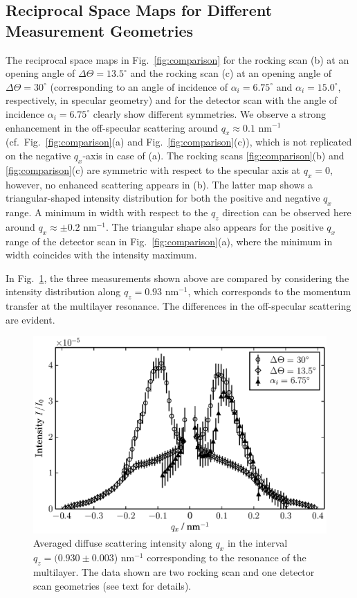 \subsection{Reciprocal Space Maps for Different Measurement Geometries} The reciprocal space maps in Fig.~\ref{fig:comparison} for the rocking scan (b) at an opening angle of $\Delta \Theta = 13.5^\circ$ and the rocking scan (c) at an opening angle of $\Delta \Theta = 30^\circ$ (corresponding to an angle of incidence of $\alpha_i = 6.75^\circ$ and $\alpha_i = 15.0^\circ$, respectively, in specular geometry) and for the detector scan with the angle of incidence $\alpha_i = 6.75^\circ$ clearly show different symmetries. We observe a strong enhancement in the off-specular scattering around $q_x\approx0.1$ nm$^{-1}$ (cf.~Fig.~\ref{fig:comparison}(a) and Fig.~\ref{fig:comparison}(c)), which is not replicated on the negative $q_x$-axis in case of (a). The rocking scans \ref{fig:comparison}(b) and \ref{fig:comparison}(c) are symmetric with respect to the specular axis at $q_x=0$, however, no enhanced scattering appears in (b). The latter map shows a triangular-shaped intensity distribution for both the positive and 
negative $q_x$ range. A minimum in width with respect to the $q_z$ direction can be observed here around $q_x \approx \pm 0.2$ nm$^{-1}$. The triangular shape also appears for the 
positive $q_x$ range 
of the detector scan in Fig.~\ref{fig:comparison}(a), where the minimum in width coincides with the intensity maximum.


In Fig.~\ref{fig:BraggSheet_DetectorAndRocking}, the three measurements shown above are compared by considering the intensity distribution along $q_z=0.93$ nm$^{-1}$, which corresponds to the momentum transfer at the multilayer resonance. The differences in the off-specular scattering are evident. 
\begin{figure}
        \includegraphics[width=0.5
        \textwidth]{img/im_mo_si/BraggSheet_DetectorAndRocking} \caption{Averaged diffuse scattering intensity along $q_x$ in the interval  $q_z=(0.930 \pm 0.003$) nm$^{-1}$ corresponding to the resonance of the multilayer. The data shown are two rocking scan and one detector scan geometries (see text for details).} \label{fig:BraggSheet_DetectorAndRocking} 
\end{figure}

